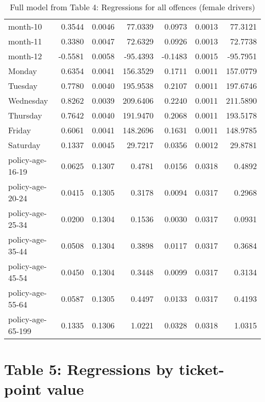 \documentclass[10pt]{article}
\begin{document}
\begin{table}[ht]
\begin{tabular}{lrrrrrr}
  month-10 & 0.3544 & 0.0046 & 77.0339 & 0.0973 & 0.0013 & 77.3121 \\ 
  month-11 & 0.3380 & 0.0047 & 72.6329 & 0.0926 & 0.0013 & 72.7738 \\ 
  month-12 & -0.5581 & 0.0058 & -95.4393 & -0.1483 & 0.0015 & -95.7951 \\ 
  Monday & 0.6354 & 0.0041 & 156.3529 & 0.1711 & 0.0011 & 157.0779 \\ 
  Tuesday & 0.7780 & 0.0040 & 195.9538 & 0.2107 & 0.0011 & 197.6746 \\ 
  Wednesday & 0.8262 & 0.0039 & 209.6406 & 0.2240 & 0.0011 & 211.5890 \\ 
  Thursday & 0.7642 & 0.0040 & 191.9470 & 0.2068 & 0.0011 & 193.5178 \\ 
  Friday & 0.6061 & 0.0041 & 148.2696 & 0.1631 & 0.0011 & 148.9785 \\ 
  Saturday & 0.1337 & 0.0045 & 29.7217 & 0.0356 & 0.0012 & 29.8781 \\ 
  policy-age-16-19 & 0.0625 & 0.1307 & 0.4781 & 0.0156 & 0.0318 & 0.4892 \\ 
  policy-age-20-24 & 0.0415 & 0.1305 & 0.3178 & 0.0094 & 0.0317 & 0.2968 \\ 
  policy-age-25-34 & 0.0200 & 0.1304 & 0.1536 & 0.0030 & 0.0317 & 0.0931 \\ 
  policy-age-35-44 & 0.0508 & 0.1304 & 0.3898 & 0.0117 & 0.0317 & 0.3684 \\ 
  policy-age-45-54 & 0.0450 & 0.1304 & 0.3448 & 0.0099 & 0.0317 & 0.3134 \\ 
  policy-age-55-64 & 0.0587 & 0.1305 & 0.4497 & 0.0133 & 0.0317 & 0.4193 \\ 
  policy-age-65-199 & 0.1335 & 0.1306 & 1.0221 & 0.0328 & 0.0318 & 1.0315 \\ 
   \hline
\end{tabular}
\caption{Full model from Table 4: Regressions for all offences (female drivers)} 
\label{tab_4_all_pts_with_age_F}
\end{table}


\clearpage
\pagebreak




\section{Table 5: Regressions by ticket-point value}



\end{document}
